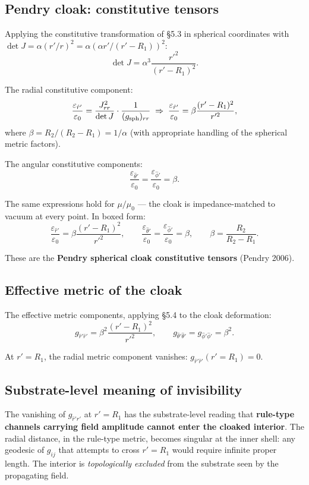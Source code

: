 \documentclass[11pt,a4paper]{article}
\begin{document}
\subsection{Pendry cloak: constitutive tensors}

Applying the constitutive transformation of \S5.3 in spherical coordinates with $\det J = \alpha(r'/r)^2 = \alpha(\alpha r'/(r' - R_1))^2$:
\[
\det J = \alpha^3 \frac{r'^2}{(r' - R_1)^2}.
\]

The radial constitutive component:
\[
\frac{\varepsilon_{\hat r'}}{\varepsilon_0} = \frac{J_{rr}^2}{\det J} \cdot \frac{1}{(g_{\rm sph})_{rr}} \;\Rightarrow\; \frac{\varepsilon_{\hat r'}}{\varepsilon_0} = \beta\frac{(r' - R_1)^2}{r'^2},
\]
where $\beta = R_2/(R_2 - R_1) = 1/\alpha$ (with appropriate handling of the spherical metric factors).

The angular constitutive components:
\[
\frac{\varepsilon_{\hat\theta'}}{\varepsilon_0} = \frac{\varepsilon_{\hat\phi'}}{\varepsilon_0} = \beta.
\]

The same expressions hold for $\mu/\mu_0$ --- the cloak is impedance-matched to vacuum at every point. In boxed form:
\[
\boxed{\frac{\varepsilon_{\hat r'}}{\varepsilon_0} = \beta\frac{(r' - R_1)^2}{r'^2}, \qquad \frac{\varepsilon_{\hat\theta'}}{\varepsilon_0} = \frac{\varepsilon_{\hat\phi'}}{\varepsilon_0} = \beta, \qquad \beta = \frac{R_2}{R_2 - R_1}.}
\]

These are the \textbf{Pendry spherical cloak constitutive tensors} (Pendry 2006).

\subsection{Effective metric of the cloak}

The effective metric components, applying \S5.4 to the cloak deformation:
\[
g_{\hat r'\hat r'} = \beta^2\frac{(r' - R_1)^2}{r'^2}, \qquad g_{\hat\theta'\hat\theta'} = g_{\hat\phi'\hat\phi'} = \beta^2.
\]

At $r' = R_1$, the radial metric component vanishes: $g_{\hat r'\hat r'}(r' = R_1) = 0$.

\subsection{Substrate-level meaning of invisibility}

The vanishing of $g_{\hat r'\hat r'}$ at $r' = R_1$ has the substrate-level reading that \textbf{rule-type channels carrying field amplitude cannot enter the cloaked interior}. The radial distance, in the rule-type metric, becomes singular at the inner shell: any geodesic of $g_{ij}$ that attempts to cross $r' = R_1$ would require infinite proper length. The interior is \emph{topologically excluded} from the substrate seen by the propagating field.
\end{document}
